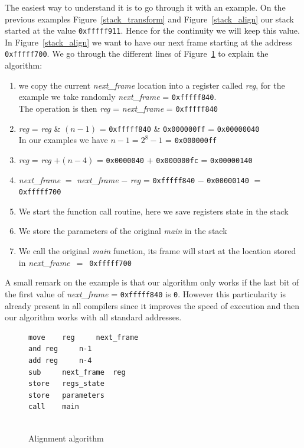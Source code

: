 \documentclass[11pt]{sdm}
\begin{document}
The easiest way to understand it is to go through it with an example. On the previous examples Figure~\ref{stack_transform} and Figure~\ref{stack_align} our stack started at the value \texttt{0xfffff911}. Hence for the continuity we will keep this value. In Figure~\ref{stack_align} we want to have our next frame starting at the address \texttt{0xfffff700}. We go through the different lines of Figure~\ref{align_algo} to explain the algorithm:
\begin{enumerate}
	\item we copy the current \textit{next\_frame} location into a register called \textit{reg}, for the example we take randomly \textit{next\_frame} =  \texttt{0xfffff840}.\\
		The operation is then \textit{reg} = \textit{next\_frame} = \texttt{0xfffff840}
	\item \textit{reg} = \textit{reg} \& $(n-1)$ = \texttt{0xfffff840} \& \texttt{0x000000ff} = \texttt{0x00000040}\\
		In our examples we have $n-1 = 2^8-1$ = \texttt{0x000000ff}
	\item \textit{reg} = \textit{reg} $+(n-4)$ = \texttt{0x0000040} $+$ \texttt{0x000000fc} = \texttt{0x00000140}
	\item \textit{next\_frame} $=$ \textit{next\_frame} $-$ \textit{reg} = \texttt{0xfffff840} $-$ \texttt{0x00000140} $=$ \texttt{0xfffff700}
	\item We start the function call routine, here we save registers state in the stack
	\item We store the parameters of the original \textit{main} in the stack
	\item We call the original \textit{main} function, its frame will start at the location stored in \textit{next\_frame}~$=$~\texttt{0xfffff700}
\end{enumerate}

A small remark on the example is that our algorithm only works if the last bit of the first value of \textit{next\_frame} = \texttt{0xfffff840} is \texttt{0}. However this particularity is already present in all compilers since it improves the speed of execution and then our algorithm works with all standard addresses.
\begin{figure}[!ht]
\centering
\begin{lstlisting}
move	reg		next_frame  
and	reg		n-1	    
add	reg		n-4    
sub 	next_frame	reg
store 	regs_state
store	parameters
call	main
	
\end{lstlisting}
\caption{Alignment algorithm}
\label{align_algo}
\end{figure}
\end{document}
